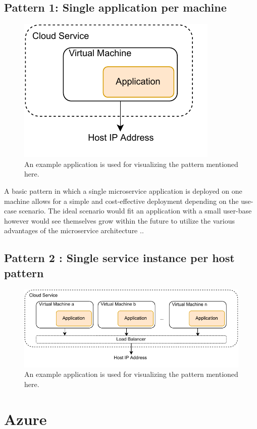 \subsection{Pattern 1: Single application per machine}
    \begin{figure}[H]
        \centering
        \includegraphics[width=0.5\linewidth]{images/Pattern-1.pdf}
        \caption{An example application is used for visualizing the pattern mentioned here.}
    \end{figure}  

A basic pattern in which a single microservice application is deployed on one machine allows for a simple and cost-effective deployment depending on the use-case scenario. The ideal scenario would fit an application with a small user-base however would see themselves grow within the future to utilize the various advantages of the microservice architecture \cite{Chr19}.. 

\subsection{Pattern 2 : Single service instance per host pattern }
    \begin{figure}[H]
        \centering
        \includegraphics[width=0.9\linewidth]{images/Pattern-2.pdf}
        \caption{An example application is used for visualizing the pattern mentioned here.}
    \end{figure}  
\section{Azure}

